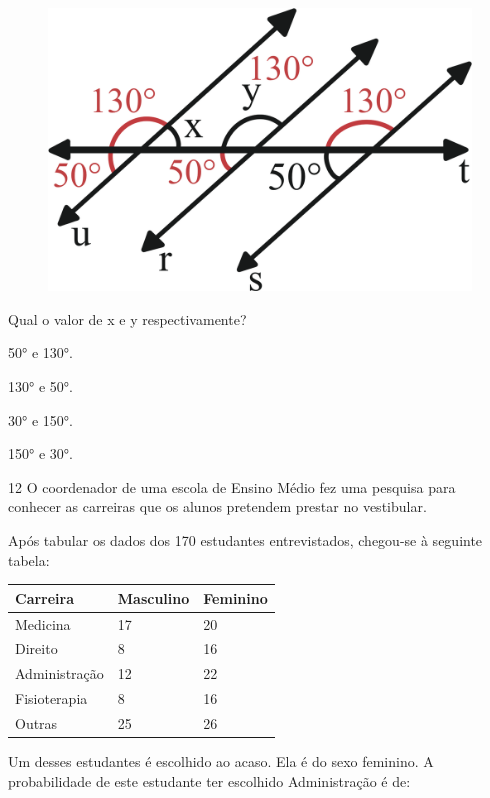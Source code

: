 \begin{figure}[htpb!]
\centering
\includegraphics[width=\textwidth]{./ilustras-mat/Simulado_1-atividade_11_resposta.png}
\end{figure}

Qual o valor de x e y respectivamente?

\begin{escolha}

  \item 50° e 130°.

  \item 130° e 50°.

  \item 30° e 150°.

  \item 150° e 30°.

\end{escolha}

\num{12} O coordenador de uma escola de Ensino Médio fez uma pesquisa para
conhecer as carreiras que os alunos pretendem prestar no vestibular.

Após tabular os dados dos 170 estudantes entrevistados, chegou-se à
seguinte tabela:

\begin{longtable}[]{@{}lll@{}}
\toprule
Carreira & Masculino & Feminino\tabularnewline
\midrule
\endhead
Medicina & 17 & 20\tabularnewline
Direito & 8 & 16\tabularnewline
Administração & 12 & 22\tabularnewline
Fisioterapia & 8 & 16\tabularnewline
Outras & 25 & 26\tabularnewline
\bottomrule
\end{longtable}

Um desses estudantes é escolhido ao acaso. Ela é do sexo
feminino. A probabilidade de este estudante ter escolhido Administração
é de:


